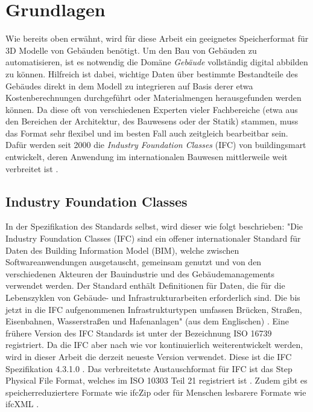 \section{Grundlagen}
Wie bereits oben erwähnt, wird für diese Arbeit ein geeignetes Speicherformat für 3D Modelle von Gebäuden benötigt.
Um den Bau von Gebäuden zu automatisieren, ist es notwendig die Domäne \textit{Gebäude} vollständig digital abbilden zu können. 
Hilfreich ist dabei, wichtige Daten über bestimmte Bestandteile des Gebäudes direkt in dem Modell zu integrieren auf Basis derer etwa Kostenberechnungen durchgeführt oder Materialmengen herausgefunden werden können.
Da diese oft von verschiedenen Experten vieler Fachbereiche (etwa aus den Bereichen der Architektur, des Bauwesens oder der Statik) stammen, muss das Format sehr flexibel und im besten Fall auch zeitgleich bearbeitbar sein.
Dafür werden seit 2000 die \textit{Industry Foundation Classes} (IFC) von buildingsmart entwickelt, deren Anwendung im internationalen Bauwesen mittlerweile weit verbreitet ist \cite{Industry61:online}.


\subsection{Industry Foundation Classes}
In der Spezifikation des Standards selbst, wird dieser wie folgt beschrieben:
"Die Industry Foundation Classes (IFC) sind ein offener internationaler Standard für Daten des Building Information Model (BIM), welche zwischen Softwareanwendungen ausgetauscht, gemeinsam genutzt und von den verschiedenen Akteuren der Bauindustrie und des Gebäudemanagements verwendet werden. 
Der Standard enthält Definitionen für Daten, die für die Lebenszyklen von Gebäude- und Infrastrukturarbeiten erforderlich sind. 
Die bis jetzt in die IFC aufgenommenen Infrastrukturtypen umfassen Brücken, Straßen, Eisenbahnen, Wasserstraßen und Hafenanlagen" (aus dem Englischen) \cite{IFCScope:online}. 
Eine frühere Version des IFC Standards ist unter der Bezeichnung ISO 16739 \cite{ISOISO1694:online} registriert.
Da die IFC aber nach wie vor kontinuierlich weiterentwickelt werden, wird in dieser Arbeit die derzeit neueste Version verwendet.
Diese ist die IFC Spezifikation 4.3.1.0 \cite{IFC4310Spezification:online}.
Das verbreitetste Austauschformat für IFC ist das Step Physical File Format, welches im ISO 10303 Teil 21 registriert ist \cite{ISO_Step:online}.
Zudem gibt es speicherreduziertere Formate wie ifcZip oder für Menschen lesbarere Formate wie ifcXML \cite{Industry93:online} \cite{IFCForma28:online}.

